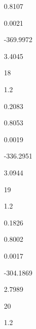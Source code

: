 \documentclass[a4paper,portrait,12pt]{article}
\begin{document}
0.8107





0.0021





-369.9972





3.4045





18





1.2





0.2083





0.8053





0.0019





-336.2951





3.0944





19





1.2





0.1826





0.8002





0.0017





-304.1869





2.7989





20





1.2
\end{document}

